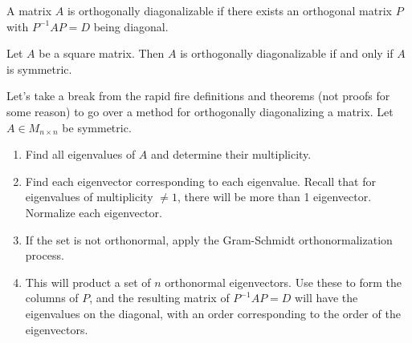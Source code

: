 \begin{definition}
    A matrix \(A\) is orthogonally diagonalizable if there exists an orthogonal matrix \(P\) with \(P ^{-1} AP=D\) being diagonal.
\end{definition}	
\begin{theorem}
    Let \(A\) be a square matrix. Then \(A\) is orthogonally diagonalizable if and only if \(A\) is symmetric.
\end{theorem}
Let's take a break from the rapid fire definitions and theorems (not proofs for some reason) to go over a method for orthogonally diagonalizing a matrix. Let \(A\in M_{n\times n}\) be symmetric.
\begin{enumerate}
    \item Find all eigenvalues of \(A\) and determine their multiplicity.
    \item Find each eigenvector corresponding to each eigenvalue. Recall that for eigenvalues of multiplicity \(\neq 1\), there will be more than 1 eigenvector. Normalize each eigenvector.
    \item If the set is not orthonormal, apply the Gram-Schmidt orthonormalization process.
    \item This will product a set of \(n\) orthonormal eigenvectors. Use these to form the columns of \(P\), and the resulting matrix of \(P ^{-1} AP=D\) will have the eigenvalues on the diagonal, with an order corresponding to the order of the eigenvectors.
\end{enumerate}